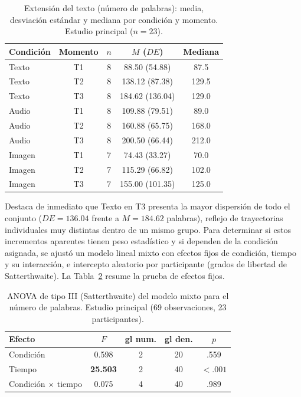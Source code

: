 \documentclass[12pt]{article}
\begin{document}
	\begin{table}[htbp]
		\centering
		\caption{Extensión del texto (número de palabras): media, desviación estándar y mediana por condición y momento. Estudio principal ($n = 23$).}
		\label{tab:desc_principal}
		\begin{tabular}{l c c c c}
			\toprule
			Condición & Momento & $n$ & $M$ ($DE$) & Mediana \\
			\midrule
			Texto  & T1 & 8 &  88.50 (54.88) &  87.5 \\
			Texto  & T2 & 8 & 138.12 (87.38) & 129.5 \\
			Texto  & T3 & 8 & 184.62 (136.04) & 129.0 \\
			\midrule
			Audio  & T1 & 8 & 109.88 (79.51) &  89.0 \\
			Audio  & T2 & 8 & 160.88 (65.75) & 168.0 \\
			Audio  & T3 & 8 & 200.50 (66.44) & 212.0 \\
			\midrule
			Imagen & T1 & 7 &  74.43 (33.27) &  70.0 \\
			Imagen & T2 & 7 & 115.29 (66.82) & 102.0 \\
			Imagen & T3 & 7 & 155.00 (101.35) & 125.0 \\
			\bottomrule
		\end{tabular}
	\end{table}
	
	Destaca de inmediato que Texto en T3 presenta la mayor dispersión de todo el conjunto ($DE = 136.04$ frente a $M = 184.62$ palabras), reflejo de trayectorias individuales muy distintas dentro de un mismo grupo. Para determinar si estos incrementos aparentes tienen peso
	estadístico y si dependen de la condición asignada, se ajustó un modelo lineal mixto con efectos fijos de condición, tiempo y su interacción, e intercepto aleatorio por participante (grados de libertad de Satterthwaite). La Tabla~\ref{tab:anova_principal} resume la prueba de
	efectos fijos.
	
	\begin{table}[htbp]
		\centering
		\caption{ANOVA de tipo III (Satterthwaite) del modelo mixto para el número de palabras. Estudio principal (69 observaciones, 23 participantes).}
		\label{tab:anova_principal}
		\begin{tabular}{l c c c c}
			\toprule
			Efecto & $F$ & gl num. & gl den. & $p$ \\
			\midrule
			Condición                &  0.598 & 2 & 20 & .559 \\
			Tiempo                   & \textbf{25.503} & 2 & 40 & \textbf{$< .001$} \\
			Condición $\times$ tiempo &  0.075 & 4 & 40 & .989 \\
			\bottomrule
		\end{tabular}
	\end{table}
	
\end{document}
